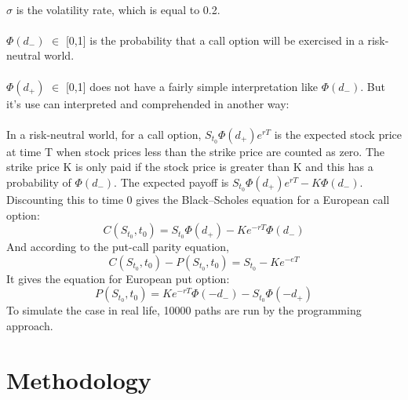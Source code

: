 \documentclass[12pt]{article}
\begin{document}
\\$\sigma$ is the volatility rate, which is equal to 0.2.\\
\\${\Phi(d_-)}$ $\in$ [0,1] is the probability that a call option will be exercised in a risk-neutral world.\\
\\${\Phi(d_+)}$ $\in$ [0,1] does not have a fairly simple interpretation like ${\Phi(d_-)}$. But it's use can interpreted and comprehended in another way:\\
\\In a risk-neutral world, for a call option, 
${S_{t_0}}{\Phi(d_+)}{e^{rT}}$ is the expected stock price at time T when stock prices less than the strike price are counted as zero. The strike price K is only paid if the stock price is greater than K and this has a probability of ${\Phi(d_-)}$. The expected payoff is ${S_{t_0}}{\Phi(d_+)}{e^{rT}} - K{\Phi(d_-)}$. Discounting this to time 0 gives the Black–Scholes equation for a European call option:
\begin{equation}
    C({S_{t_0}},{t_0}) = {S_{t_0}} {\Phi(d_+)} - K {e^{-rT}} {\Phi(d_-)}
\end{equation}
And according to the put-call parity equation,
\begin{equation}
    C({S_{t_0}},{t_0}) - P({S_{t_0}},{t_0}) = {S_{t_0}} - {K{e^{-eT}}}
\end{equation}
It gives the equation for European put option:
\begin{equation}
    P({S_{t_0}},{t_0}) = K {e^{-rT}} {\Phi(-d_-)} - {S_{t_0}} {\Phi(-d_+)}
\end{equation}
To simulate the case in real life, 10000 paths are run by the programming approach.




\section{Methodology}
\end{document}
